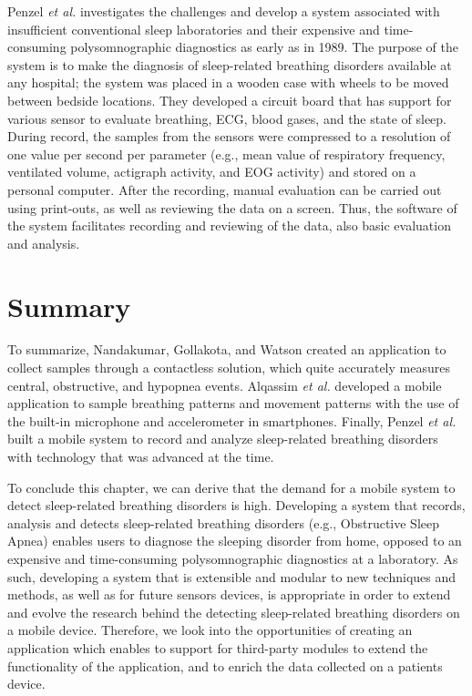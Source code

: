 Penzel \textit{et al.} \cite{mobilesleeplab} investigates the challenges and develop a system associated with insufficient conventional sleep laboratories and their expensive and time-consuming polysomnographic diagnostics as early as in 1989. The purpose of the system is to make the diagnosis of sleep-related breathing disorders available at any hospital; the system was placed in a wooden case with wheels to be moved between bedside locations. They developed a circuit board that has support for various sensor to evaluate breathing, ECG, blood gases, and the state of sleep. During record, the samples from the sensors were compressed to a resolution of one value per second per parameter (e.g., mean value of respiratory frequency, ventilated volume, actigraph activity, and EOG activity) and stored on a personal computer. After the recording, manual evaluation can be carried out using print-outs, as well as reviewing the data on a screen. Thus, the software of the system facilitates recording and reviewing of the data, also basic evaluation and analysis. 

\section{Summary}

To summarize, Nandakumar, Gollakota, and Watson created an application to collect samples through a contactless solution, which quite accurately measures central, obstructive, and hypopnea events. Alqassim \textit{et al.} developed a mobile application to sample breathing patterns and movement patterns with the use of the built-in microphone and accelerometer in smartphones. Finally, Penzel \textit{et al.} built a mobile system to record and analyze sleep-related breathing disorders with technology that was advanced at the time.

To conclude this chapter, we can derive that the demand for a mobile system to detect sleep-related breathing disorders is high. Developing a system that records, analysis and detects sleep-related breathing disorders (e.g., Obstructive Sleep Apnea) enables users to diagnose the sleeping disorder from home, opposed to an expensive and time-consuming polysomnographic diagnostics at a laboratory. As such, developing a system that is extensible and modular to new techniques and methods, as well as for future sensors devices, is appropriate in order to extend and evolve the research behind the detecting sleep-related breathing disorders on a mobile device. Therefore, we look into the opportunities of creating an application which enables to support for third-party modules to extend the functionality of the application, and to enrich the data collected on a patients device.
